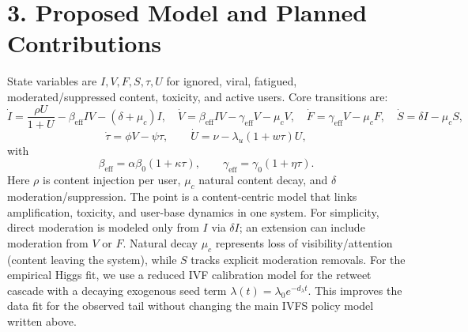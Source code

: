 \documentclass[11pt]{article}
\begin{document}
\section*{3. Proposed Model and Planned Contributions}
State variables are $I,V,F,S,\tau,U$ for ignored, viral, fatigued, moderated/suppressed content, toxicity, and active users. Core transitions are:
\[
\dot{I}=\frac{\rho U}{1+U}-\beta_{\mathrm{eff}}IV-(\delta+\mu_c)I,\quad
\dot{V}=\beta_{\mathrm{eff}}IV-\gamma_{\mathrm{eff}}V-\mu_cV,\quad
\dot{F}=\gamma_{\mathrm{eff}}V-\mu_cF,\quad
\dot{S}=\delta I-\mu_cS,
\]
\[
\dot{\tau}=\phi V-\psi\tau,\qquad
\dot{U}=\nu-\lambda_u(1+w\tau)U,
\]
with
\[
\beta_{\mathrm{eff}}=\alpha\beta_0(1+\kappa\tau),\qquad
\gamma_{\mathrm{eff}}=\gamma_0(1+\eta\tau).
\]
Here $\rho$ is content injection per user, $\mu_c$ natural content decay, and $\delta$ moderation/suppression. The point is a content-centric model that links amplification, toxicity, and user-base dynamics in one system.
For simplicity, direct moderation is modeled only from $I$ via $\delta I$; an extension can include moderation from $V$ or $F$.
Natural decay $\mu_c$ represents loss of visibility/attention (content leaving the system), while $S$ tracks explicit moderation removals.
For the empirical Higgs fit, we use a reduced IVF calibration model for the retweet cascade with a decaying exogenous seed term $\lambda(t)=\lambda_0 e^{-d_\lambda t}$. This improves the data fit for the observed tail without changing the main IVFS policy model written above.
\end{document}
